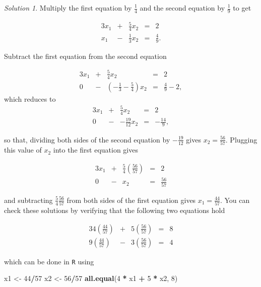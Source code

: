 \documentclass[
]{book}
\newenvironment{Shaded}{\begin{snugshade}}{\end{snugshade}}
\newcommand{\DecValTok}[1]{\textcolor[rgb]{0.00,0.00,0.81}{#1}}
\newcommand{\KeywordTok}[1]{\textcolor[rgb]{0.13,0.29,0.53}{\textbf{#1}}}
\newcommand{\NormalTok}[1]{#1}
\newcommand{\OperatorTok}[1]{\textcolor[rgb]{0.81,0.36,0.00}{\textbf{#1}}}
\newcommand{\StringTok}[1]{\textcolor[rgb]{0.31,0.60,0.02}{#1}}
\theoremstyle{definition}
\theoremstyle{definition}
\theoremstyle{definition}
\theoremstyle{definition}
\theoremstyle{remark}
\newtheorem*{solution}{Solution}
\begin{document}
\begin{solution}

Multiply the first equation by \(\frac{1}{4}\) and the second equation by \(\frac{1}{9}\) to get

\begin{alignat*}{3}
x_1 & {}+{} & \frac{5}{4} x_2 & {}={} & 2 \\
x_1 & {}-{} &  \frac{1}{3}x_2 & {}={} & \frac{4}{9}.
\end{alignat*}

Subtract the first equation from the second equation

\begin{alignat*}{3}
x_1 & {}+{} & \frac{5}{4} x_2 & {}={} & 2 \\
0 & {}-{} &  (-\frac{1}{3} - \frac{5}{4}) x_2 & {}={} & \frac{4}{9} - 2,
\end{alignat*}
which reduces to
\begin{alignat*}{3}
x_1 & {}+{} & \frac{5}{4} x_2 & {}={} & 2 \\
0 & {}-{} &  -\frac{19}{12} x_2 & {}={} & -\frac{14}{9},
\end{alignat*}

so that, dividing both sides of the second equation by \(-\frac{19}{12}\) gives \(x_2 = \frac{56}{57}\). Plugging this value of \(x_2\) into the first equation gives

\begin{alignat*}{3}
x_1 & {}+{} & \frac{5}{4} \left(\frac{56}{57}\right) & {}={} & 2 \\
0 & {}-{} &   x_2 & {}={} & \frac{56}{57}
\end{alignat*}

and subtracting \(\frac{5}{4} \frac{56}{57}\) from both sides of the first equation gives \(x_1 = \frac{44}{57}\). You can check these solutions by verifying that the following two equations hold

\begin{alignat*}{3}
4 \left(\frac{44}{57}\right) & {}+{} & 5  \left(\frac{56}{57}\right) & {}={} & 8 \\
9 \left(\frac{44}{57}\right) & {}-{} & 3 \left(\frac{56}{57}\right)& {}={} & 4
\end{alignat*}

which can be done in \texttt{R} using

\begin{Shaded}
\begin{Highlighting}[]
\NormalTok{x1 <-}\StringTok{ }\DecValTok{44}\OperatorTok{/}\DecValTok{57}
\NormalTok{x2 <-}\StringTok{ }\DecValTok{56}\OperatorTok{/}\DecValTok{57}
\KeywordTok{all.equal}\NormalTok{(}\DecValTok{4} \OperatorTok{*}\StringTok{ }\NormalTok{x1 }\OperatorTok{+}\StringTok{ }\DecValTok{5} \OperatorTok{*}\StringTok{ }\NormalTok{x2, }\DecValTok{8}\NormalTok{)}
\end{Highlighting}
\end{Shaded}


\end{solution}
\end{document}
